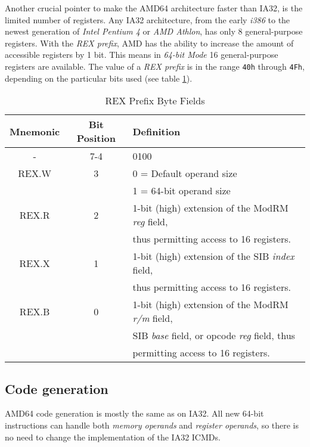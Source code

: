 Another crucial pointer to make the AMD64 architecture faster than
IA32, is the limited number of registers. Any IA32 architecture, from
the early \textit{i386} to the newest generation of \textit{Intel
Pentium 4} or \textit{AMD Athlon}, has only 8 general-purpose
registers. With the \textit{REX prefix}, AMD has the ability to
increase the amount of accessible registers by 1 bit. This means in
\textit{64-bit Mode} 16 general-purpose registers are available. The
value of a \textit{REX prefix} is in the range \texttt{40h} through
\texttt{4Fh}, depending on the particular bits used (see table
\ref{REX}).

\begin{table}
\begin{center}
\begin{tabular}[b]{|c|c|l|}
\hline
Mnemonic & Bit Position & Definition \\ \hline
-        & 7-4          & 0100 \\ \hline
REX.W    & 3            & 0 = Default operand size \\
         &              & 1 = 64-bit operand size \\ \hline
REX.R    & 2            & 1-bit (high) extension of the ModRM \textit{reg} field, \\
         &              & thus permitting access to 16 registers. \\ \hline
REX.X    & 1            & 1-bit (high) extension of the SIB \textit{index} field, \\
         &              & thus permitting access to 16 registers. \\ \hline
REX.B    & 0            & 1-bit (high) extension of the ModRM \textit{r/m} field, \\
         &              & SIB \textit{base} field, or opcode \textit{reg} field, thus \\
         &              & permitting access to 16 registers. \\ \hline
\end{tabular}
\caption{REX Prefix Byte Fields}
\label{REX}
\end{center}
\end{table}


\subsection{Code generation}

AMD64 code generation is mostly the same as on IA32. All new 64-bit
instructions can handle both \textit{memory operands} and
\textit{register operands}, so there is no need to change the
implementation of the IA32 ICMDs.

